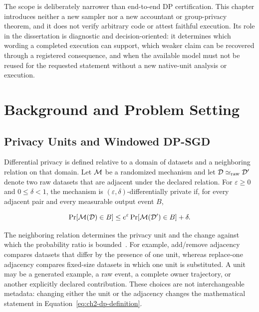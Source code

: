 The scope is deliberately narrower than end-to-end DP certification.  This chapter
introduces neither a new sampler nor a new accountant or group-privacy theorem, and
it does not verify arbitrary code or attest faithful execution.  Its role in the
dissertation is diagnostic and decision-oriented: it determines which wording a
completed execution can support, which weaker claim can be recovered through a
registered consequence, and when the available model must not be reused for the
requested statement without a new native-unit analysis or execution.

\section{Background and Problem Setting}
\subsection{Privacy Units and Windowed DP-SGD}
\label{subsec:privacy-units-windowed-dpsgd}

Differential privacy is defined relative to a domain of datasets and a neighboring
relation on that domain.  Let \(\mathcal{M}\) be a randomized mechanism and let
\(\mathcal{D}\simeq_{\mathrm{raw}}\mathcal{D}'\) denote two raw datasets that are
adjacent under the declared relation.  For \(\varepsilon\geq0\) and
\(0\leq\delta<1\), the mechanism is \((\varepsilon,\delta)\)-differentially
private if, for every adjacent pair and every measurable output event \(B\),

\begin{equation}
    \Pr\!\left[\mathcal{M}(\mathcal{D})\in B\right]
    \leq
    e^{\varepsilon}
    \Pr\!\left[\mathcal{M}(\mathcal{D}')\in B\right]
    +\delta.
    \label{eq:ch2-dp-definition}
\end{equation}

The neighboring relation determines the privacy unit and the change against which
the probability ratio is bounded~\cite{dwork2014algorithmic,near2025guidelines}.
For example, add/remove adjacency compares datasets that differ by the presence of
one unit, whereas replace-one adjacency compares fixed-size datasets in which one
unit is substituted.  A unit may be a generated example, a raw event, a complete
owner trajectory, or another explicitly declared contribution.  These choices are
not interchangeable metadata: changing either the unit or the adjacency changes
the mathematical statement in Equation~\eqref{eq:ch2-dp-definition}.

